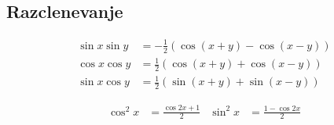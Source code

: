 \documentclass[a4paper,oneside,10pt]{article}
\theoremstyle{definition}
\begin{document}
\begin{multicols}{2}
	\subsection*{Razclenevanje}
	\begin{align*}
		\sin{x}\sin{y} &= -\frac{1}{2}\left(\cos{(x+y)} - \cos{(x-y)} \right)\\
		\cos{x}\cos{y} &= \frac{1}{2}\left(\cos{(x+y)} + \cos{(x-y)} \right)\\
		\sin{x}\cos{y} &= \frac{1}{2}\left(\sin{(x+y)} + \sin{(x-y)} \right)
	\end{align*}

	\begin{align*}
		\cos^2{x} &= \frac{\cos{2x} + 1}{2} & \sin^2{x} &= \frac{1 - \cos{2x}}{2}
	\end{align*}	


\end{multicols}
\end{document}
